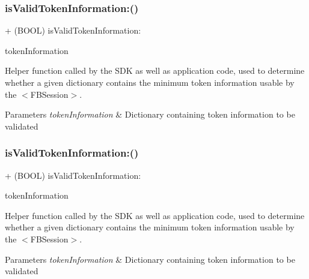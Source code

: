 \subsubsection{\texorpdfstring{is\+Valid\+Token\+Information\+:()}{isValidTokenInformation:()}\hspace{0.1cm}{\footnotesize\ttfamily [3/5]}}
{\footnotesize\ttfamily + (B\+O\+OL) is\+Valid\+Token\+Information\+: \begin{DoxyParamCaption}\item[{(N\+S\+Dictionary $\ast$)}]{token\+Information }\end{DoxyParamCaption}}

Helper function called by the S\+DK as well as application code, used to determine whether a given dictionary contains the minimum token information usable by the $<$\+F\+B\+Session$>$.


\begin{DoxyParams}{Parameters}
{\em token\+Information} & Dictionary containing token information to be validated \\
\hline
\end{DoxyParams}
\mbox{\label{interfaceFBSessionTokenCachingStrategy_a3974571bceb0745f400bf2a6674a963f}} 
\subsubsection{\texorpdfstring{is\+Valid\+Token\+Information\+:()}{isValidTokenInformation:()}\hspace{0.1cm}{\footnotesize\ttfamily [4/5]}}
{\footnotesize\ttfamily + (B\+O\+OL) is\+Valid\+Token\+Information\+: \begin{DoxyParamCaption}\item[{(N\+S\+Dictionary $\ast$)}]{token\+Information }\end{DoxyParamCaption}}

Helper function called by the S\+DK as well as application code, used to determine whether a given dictionary contains the minimum token information usable by the $<$\+F\+B\+Session$>$.


\begin{DoxyParams}{Parameters}
{\em token\+Information} & Dictionary containing token information to be validated \\
\hline
\end{DoxyParams}
\mbox{\label{interfaceFBSessionTokenCachingStrategy_a3974571bceb0745f400bf2a6674a963f}} 
